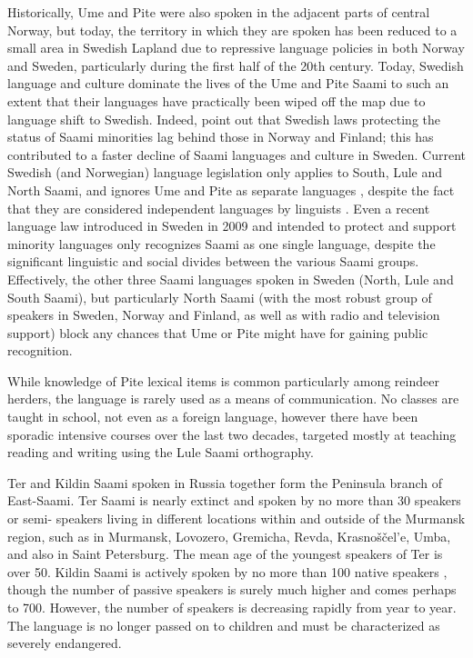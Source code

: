\documentclass[a4paper,12pt]{article}
\begin{document}
Historically, Ume and Pite were also spoken in the adjacent parts of central Norway, but today, the territory in which they are spoken has been reduced to a small area in Swedish Lapland due to repressive language policies in both Norway and Sweden, particularly during the first half of the 20th century. Today, Swedish language and culture dominate the lives of the Ume and Pite Saami to such an extent that their languages have practically been wiped off the map due to language shift to Swedish. Indeed, \citet[123]{blokland-etal2003} point out that Swedish laws protecting the status of Saami minorities lag behind those in Norway and Finland; this has contributed to a faster decline of Saami languages and culture in Sweden. Current Swedish (and Norwegian) language legislation only applies to South, Lule and North Saami, and ignores Ume and Pite as separate languages \cite[180]{kulonen-etal2005}, despite the fact that they are considered independent languages by linguists \citep[cf.][]{gordon2005,sammallahti1998b}. Even a recent language law introduced in Sweden in 2009 and intended to protect and support minority languages only recognizes Saami as one single language, despite the significant linguistic and social divides between the various Saami groups. Effectively, the other three Saami languages spoken in Sweden (North, Lule and South Saami), but particularly North Saami (with the most robust group of speakers in Sweden, Norway and Finland, as well as with radio and television support) block any chances that Ume or Pite might have for gaining public recognition. 

While knowledge of Pite lexical items is common particularly among reindeer herders, the language is rarely used as a means of communication. No classes are taught in school, not even as a foreign language, however there have been sporadic intensive courses over the last two decades, targeted mostly at teaching reading and writing using the Lule Saami orthography.

Ter and Kildin Saami spoken in Russia together form the Peninsula branch of East-Saami. Ter Saami is nearly extinct and spoken by no more than 30 speakers or semi- speakers living in different locations within and outside of the Murmansk region, such as in Murmansk, Lovozero, Gremicha, Revda, Krasnoščel'e, Umba, and also in Saint Petersburg. The mean age of the youngest speakers of Ter is over 50. Kildin Saami is actively spoken by no more than 100 native speakers \citep{scheller2010}, though the number of passive speakers is surely much higher and comes perhaps to 700. However, the number of speakers is decreasing rapidly from year to year. The language is no longer passed on to children and must be characterized as severely endangered.
\end{document}
